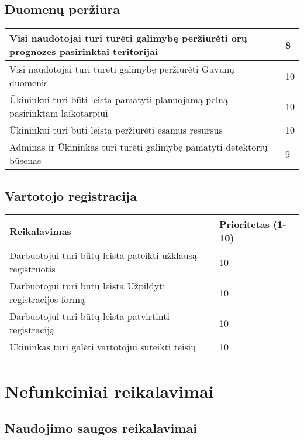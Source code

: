 \documentclass[oneside]{VUMIFPSkursinis}
\begin{document}
\subsection{Duomenų peržiūra}

\begin{table}[htbp]
	\begin{tabularx}{1\textwidth}{ |X|P{3cm }| }
       	           \hline
        		 Visi naudotojai turi turėti galimybę peržiūrėti orų prognozes pasirinktai teritorijai & 8 \\ \hline
        		 Visi naudotojai turi turėti galimybę peržiūrėti Guvūnų duomenis & 10 \\ \hline
        		 Ūkininkui turi būti leista pamatyti planuojamą pelną pasirinktam laikotarpiui & 10 \\ \hline
        		 Ūkininkui turi būti leista peržiūrėti  esamus resursus & 10 \\ \hline
        		 Adminas ir Ūkininkas turi turėti galimybę pamatyti detektorių būsenas & 9 \\ \hline
	\end{tabularx}
\end{table}

\subsection{Vartotojo registracija}

\begin{table}[htbp]
	\begin{tabularx}{1\textwidth}{ |X|P{3cm }| }
       	          \hline
           	Reikalavimas &  Prioritetas (1-10)  \\   \hline 
        		Darbuotojui turi būtų leista pateikti užklausą registruotis  &  10  \\   \hline
         		Darbuotojui turi būtų leista Užpildyti registracijos formą  &  10  \\   \hline
        		Darbuotojui turi būtų leista patvirtinti registraciją  & 10  \\   \hline
        		Ūkininkas turi galėti vartotojui suteikti teisių & 10 \\ \hline
	\end{tabularx}
\end{table}

\section{Nefunkciniai reikalavimai}
\subsection{Naudojimo saugos reikalavimai}
\end{document}
